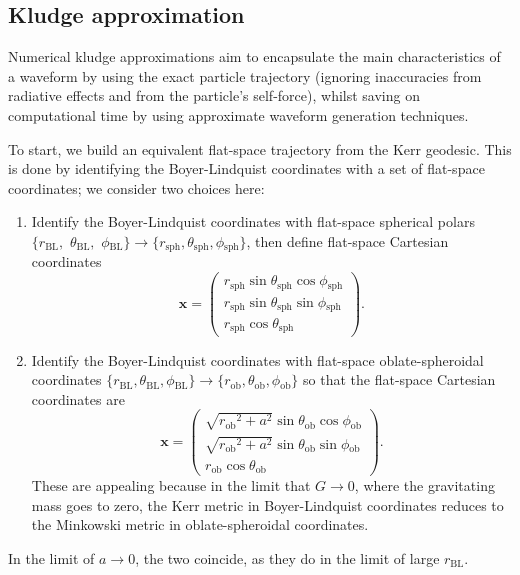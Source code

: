 \documentclass[useAMS,usedcolumn,usegraphicx,usenatbib]{mn2e}
\newcommand{\sub}[1]{\ensuremath{_\mathrm{#1}}}
\begin{document}
\subsection{Kludge approximation}

Numerical kludge approximations aim to encapsulate the main characteristics of a waveform by using the exact particle trajectory (ignoring inaccuracies from radiative effects and from the particle's self-force), whilst saving on computational time by using approximate waveform generation techniques.

To start, we build an equivalent flat-space trajectory from the Kerr geodesic. This is done by identifying the Boyer-Lindquist coordinates with a set of flat-space coordinates; we consider two choices here:
\begin{enumerate}
\item Identify the Boyer-Lindquist coordinates with flat-space spherical polars $\{r\sub{BL},$ $\theta\sub{BL},$ $\phi\sub{BL}\} \rightarrow \{r\sub{sph}, \theta\sub{sph}, \phi\sub{sph}\}$, then define flat-space Cartesian coordinates \citep{Gair2005, Babak2007}
\begin{equation}
\boldsymbol{x} = \begin{pmatrix}
r\sub{sph} \sin\theta\sub{sph}\cos\phi\sub{sph} \\
r\sub{sph} \sin\theta\sub{sph}\sin\phi\sub{sph} \\
r\sub{sph} \cos\theta\sub{sph}
\end{pmatrix}.
\end{equation}
\item Identify the Boyer-Lindquist coordinates with flat-space oblate-spheroidal coordinates $\{r\sub{BL}, \theta\sub{BL}, \phi\sub{BL}\} \rightarrow \{r\sub{ob}, \theta\sub{ob}, \phi\sub{ob}\}$ so that the flat-space Cartesian coordinates are
\begin{equation}
\boldsymbol{x} = \begin{pmatrix}
\sqrt{{r\sub{ob}}^2 + a^2} \sin\theta\sub{ob}\cos\phi\sub{ob} \\
\sqrt{{r\sub{ob}}^2 + a^2} \sin\theta\sub{ob}\sin\phi\sub{ob} \\
r\sub{ob} \cos\theta\sub{ob}
\end{pmatrix}.
\end{equation}
These are appealing because in the limit that $G \rightarrow 0$, where the gravitating mass goes to zero, the Kerr metric in Boyer-Lindquist coordinates reduces to the Minkowski metric in oblate-spheroidal coordinates.
\end{enumerate}
In the limit of $a \rightarrow 0$, the two coincide, as they do in the limit of large $r\sub{BL}$.
\end{document}
